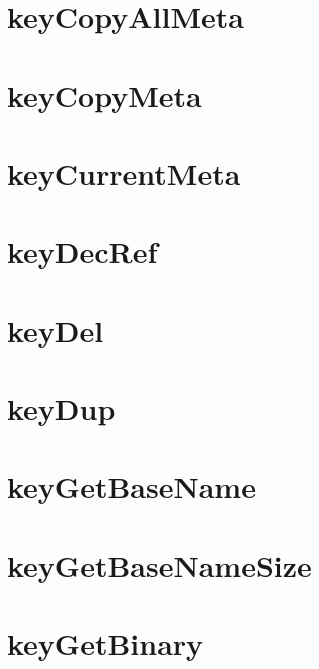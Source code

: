 \let\mypdfximage\pdfximage\def\pdfximage{\immediate\mypdfximage}\documentclass[twoside]{book}
\newcommand{\+}{\discretionary{\mbox{\scriptsize$\hookleftarrow$}}{}{}}
\begin{document}
\chapter{key\+Copy\+All\+Meta}
\label{doc_api_review_core_keyCopyAllMeta_md}

\chapter{key\+Copy\+Meta}
\label{doc_api_review_core_keyCopyMeta_md}

\chapter{key\+Current\+Meta}
\label{doc_api_review_core_keyCurrentMeta_md}

\chapter{key\+Dec\+Ref}
\label{doc_api_review_core_keyDecRef_md}

\chapter{key\+Del}
\label{doc_api_review_core_keyDel_md}

\chapter{key\+Dup}
\label{doc_api_review_core_keyDup_md}

\chapter{key\+Get\+Base\+Name}
\label{doc_api_review_core_keyGetBaseName_md}

\chapter{key\+Get\+Base\+Name\+Size}
\label{doc_api_review_core_keyGetBaseNameSize_md}

\chapter{key\+Get\+Binary}
\label{doc_api_review_core_keyGetBinary_md}

\end{document}
